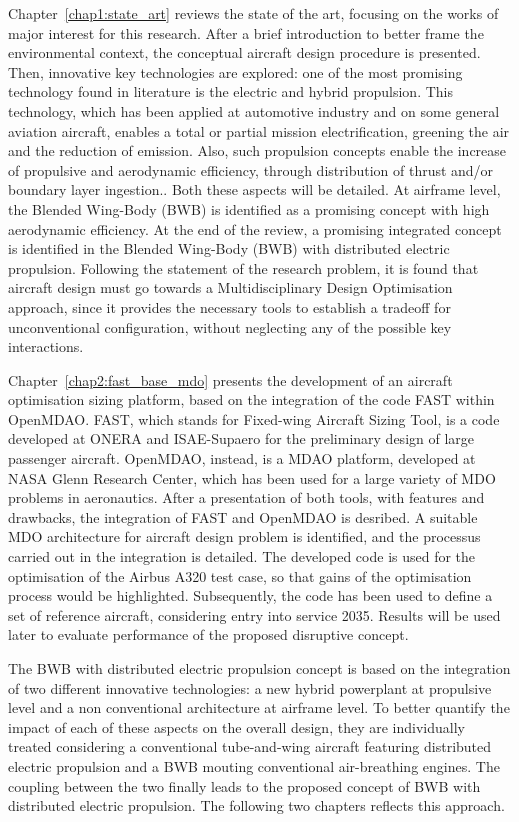 Chapter~\ref{chap1:state_art} reviews the state of the art, focusing on the works of major interest for this research. 
After a brief introduction to better frame the environmental context, the conceptual aircraft design procedure is presented.
Then, innovative key technologies are explored: one of the most promising technology found in literature is the electric and hybrid propulsion. 
This technology, which has been applied at automotive industry and on some general aviation aircraft, enables a total or partial mission electrification, greening the air and the reduction of emission. 
Also, such propulsion concepts enable the increase of propulsive and aerodynamic efficiency, through distribution of thrust and/or boundary layer ingestion.. 
Both these aspects will be detailed. 
At airframe level, the Blended Wing-Body (BWB) is identified as a promising concept with high aerodynamic efficiency. 
At the end of the review, a promising integrated concept is identified in the Blended Wing-Body (BWB) with distributed electric propulsion.
Following the statement of the research problem, it is found that aircraft design must go towards a Multidisciplinary Design Optimisation approach, since it provides the necessary tools to establish a tradeoff for unconventional configuration, without neglecting any of the possible key interactions. 

Chapter~\ref{chap2:fast_base_mdo} presents the development of an aircraft optimisation sizing platform, based on the integration of the code FAST within OpenMDAO. 
FAST, which stands for Fixed-wing Aircraft Sizing Tool, is a code developed at ONERA and ISAE-Supaero for the preliminary design of large passenger aircraft. 
OpenMDAO, instead, is a MDAO platform, developed at NASA Glenn Research Center, which has been used for a large variety of MDO problems in aeronautics.
After a presentation of both tools, with features and drawbacks, the integration of FAST and OpenMDAO is desribed.
A suitable MDO architecture for aircraft design problem is identified, and the processus carried out in the integration is detailed.
The developed code is used for the optimisation of the Airbus A320 test case, so that gains of the optimisation process would be highlighted.
Subsequently, the code has been used to define a set of reference aircraft, considering entry into service 2035. 
Results will be used later to evaluate performance of the proposed disruptive concept. 

The BWB with distributed electric propulsion concept is based on the integration of two different innovative technologies: a new hybrid powerplant at propulsive level and a non conventional architecture at airframe level. 
To better quantify the impact of each of these aspects on the overall design, they are individually treated considering a conventional tube-and-wing aircraft featuring distributed electric propulsion and a BWB mouting conventional air-breathing engines. 
The coupling between the two finally leads to the proposed concept of BWB with distributed electric propulsion. 
The following two chapters reflects this approach.

